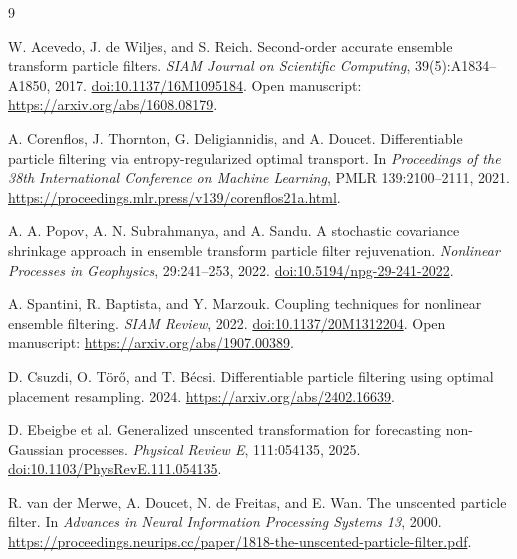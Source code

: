 \documentclass[11pt,a4paper]{article}
\begin{document}
\begin{thebibliography}{9}

W. Acevedo, J. de Wiljes, and S. Reich.
Second-order accurate ensemble transform particle filters.
\emph{SIAM Journal on Scientific Computing}, 39(5):A1834--A1850, 2017.
\href{https://doi.org/10.1137/16M1095184}{doi:10.1137/16M1095184}.
Open manuscript: \url{https://arxiv.org/abs/1608.08179}.

A. Corenflos, J. Thornton, G. Deligiannidis, and A. Doucet.
Differentiable particle filtering via entropy-regularized optimal transport.
In \emph{Proceedings of the 38th International Conference on Machine Learning},
PMLR 139:2100--2111, 2021.
\url{https://proceedings.mlr.press/v139/corenflos21a.html}.

A. A. Popov, A. N. Subrahmanya, and A. Sandu.
A stochastic covariance shrinkage approach in ensemble transform particle
filter rejuvenation.
\emph{Nonlinear Processes in Geophysics}, 29:241--253, 2022.
\href{https://doi.org/10.5194/npg-29-241-2022}{doi:10.5194/npg-29-241-2022}.

A. Spantini, R. Baptista, and Y. Marzouk.
Coupling techniques for nonlinear ensemble filtering.
\emph{SIAM Review}, 2022.
\href{https://doi.org/10.1137/20M1312204}{doi:10.1137/20M1312204}.
Open manuscript: \url{https://arxiv.org/abs/1907.00389}.

D. Csuzdi, O. T\"or\H{o}, and T. B\'ecsi.
Differentiable particle filtering using optimal placement resampling.
2024. \url{https://arxiv.org/abs/2402.16639}.

D. Ebeigbe et al.
Generalized unscented transformation for forecasting non-Gaussian processes.
\emph{Physical Review E}, 111:054135, 2025.
\href{https://doi.org/10.1103/PhysRevE.111.054135}
{doi:10.1103/PhysRevE.111.054135}.

R. van der Merwe, A. Doucet, N. de Freitas, and E. Wan.
The unscented particle filter.
In \emph{Advances in Neural Information Processing Systems 13}, 2000.
\url{https://proceedings.neurips.cc/paper/1818-the-unscented-particle-filter.pdf}.

\end{thebibliography}
\end{document}
